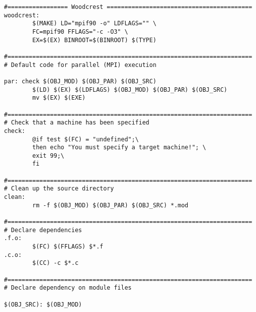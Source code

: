 \begin{verbatim}
#================= Woodcrest =========================================
woodcrest:
        $(MAKE) LD="mpif90 -o" LDFLAGS="" \
        FC=mpif90 FFLAGS="-c -O3" \
        EX=$(EX) BINROOT=$(BINROOT) $(TYPE)

#=====================================================================
# Default code for parallel (MPI) execution

par: check $(OBJ_MOD) $(OBJ_PAR) $(OBJ_SRC)
        $(LD) $(EX) $(LDFLAGS) $(OBJ_MOD) $(OBJ_PAR) $(OBJ_SRC)
        mv $(EX) $(EXE)

#=====================================================================
# Check that a machine has been specified
check:
        @if test $(FC) = "undefined";\
        then echo "You must specify a target machine!"; \
        exit 99;\
        fi

#=====================================================================
# Clean up the source directory
clean:
        rm -f $(OBJ_MOD) $(OBJ_PAR) $(OBJ_SRC) *.mod

#=====================================================================
# Declare dependencies
.f.o: 
        $(FC) $(FFLAGS) $*.f
.c.o: 
        $(CC) -c $*.c

#=====================================================================
# Declare dependency on module files

$(OBJ_SRC): $(OBJ_MOD)
\end{verbatim}
